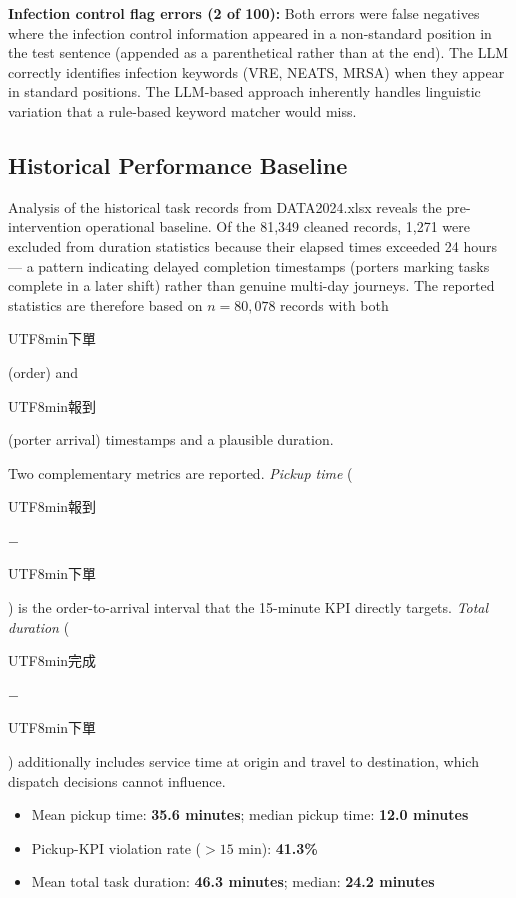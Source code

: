 \documentclass[12pt,a4paper]{article}
\begin{document}
\textbf{Infection control flag errors (2 of 100):} Both errors were false negatives where the infection control information appeared in a non-standard position in the test sentence (appended as a parenthetical rather than at the end). The LLM correctly identifies infection keywords (VRE, NEATS, MRSA) when they appear in standard positions. The LLM-based approach inherently handles linguistic variation that a rule-based keyword matcher would miss.

\subsection{Historical Performance Baseline}
\label{sec:baseline}

Analysis of the historical task records from DATA2024.xlsx reveals the pre-intervention operational baseline. Of the 81,349 cleaned records, 1,271 were excluded from duration statistics because their elapsed times exceeded 24 hours --- a pattern indicating delayed completion timestamps (porters marking tasks complete in a later shift) rather than genuine multi-day journeys. The reported statistics are therefore based on $n = 80{,}078$ records with both \begin{CJK}{UTF8}{min}下單\end{CJK} (order) and \begin{CJK}{UTF8}{min}報到\end{CJK} (porter arrival) timestamps and a plausible duration.

Two complementary metrics are reported. \textit{Pickup time} (\begin{CJK}{UTF8}{min}報到\end{CJK} $-$ \begin{CJK}{UTF8}{min}下單\end{CJK}) is the order-to-arrival interval that the 15-minute KPI directly targets. \textit{Total duration} (\begin{CJK}{UTF8}{min}完成\end{CJK} $-$ \begin{CJK}{UTF8}{min}下單\end{CJK}) additionally includes service time at origin and travel to destination, which dispatch decisions cannot influence.

\begin{itemize}
  \item Mean pickup time: \textbf{35.6 minutes}; median pickup time: \textbf{12.0 minutes}
  \item Pickup-KPI violation rate ($>15$ min): \textbf{41.3\%}
  \item Mean total task duration: \textbf{46.3 minutes}; median: \textbf{24.2 minutes}
\end{itemize}
\end{document}
